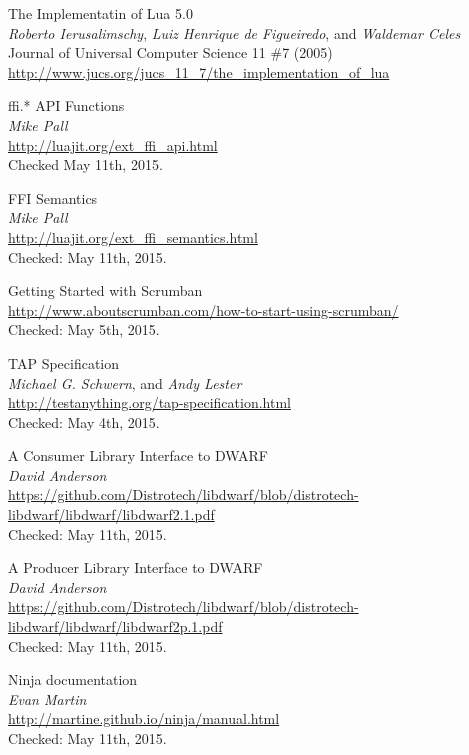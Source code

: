 \begin{thebibliography}{99}
		The Implementatin of Lua 5.0 \\
		\emph{Roberto Ierusalimschy}, \emph{Luiz Henrique de Figueiredo}, and
		\emph{Waldemar Celes} \\
		Journal of Universal Computer Science 11 \#7 (2005) \\
		\url{http://www.jucs.org/jucs_11_7/the_implementation_of_lua}

		ffi.* API Functions \\
		\emph{Mike Pall} \\
		\url{http://luajit.org/ext_ffi_api.html} \\
		Checked May 11th, 2015.

		FFI Semantics \\
		\emph{Mike Pall} \\
		\url{http://luajit.org/ext_ffi_semantics.html} \\
		Checked: May 11th, 2015.

		Getting Started with Scrumban \\
		\url{http://www.aboutscrumban.com/how-to-start-using-scrumban/} \\
		Checked: May 5th, 2015.

		TAP Specification \\
		\emph{Michael G. Schwern}, and \emph{Andy Lester} \\
		\url{http://testanything.org/tap-specification.html} \\
		Checked: May 4th, 2015.

		A Consumer Library Interface to DWARF \\
		\emph{David Anderson} \\
		\url{https://github.com/Distrotech/libdwarf/blob/distrotech-libdwarf/libdwarf/libdwarf2.1.pdf} \\
		Checked: May 11th, 2015.

		A Producer Library Interface to DWARF \\
		\emph{David Anderson} \\
		\url{https://github.com/Distrotech/libdwarf/blob/distrotech-libdwarf/libdwarf/libdwarf2p.1.pdf} \\
		Checked: May 11th, 2015.

		Ninja documentation \\
		\emph{Evan Martin} \\
		\url{http://martine.github.io/ninja/manual.html} \\
		Checked: May 11th, 2015.


\end{thebibliography}
